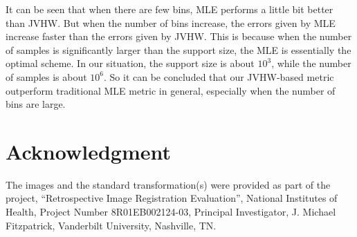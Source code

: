 \documentclass{IEEEtran}
\begin{document}
  It can be seen that when there are few bins, MLE performs a little bit better than JVHW. But when the number of bins increase, the errors given by MLE increase faster than the errors given by JVHW. This is because when the number of samples is significantly larger than the support size, the MLE is essentially the optimal scheme. In our situation, the support size is about $10^3$, while the number of samples is about $10^6$. So it can be concluded that our JVHW-based metric outperform traditional MLE metric in general, especially when the number of bins are large.

  \section{Acknowledgment}

  The images and the standard transformation(s) were provided as part of the project, ``Retrospective Image Registration Evaluation'', National Institutes of Health, Project Number 8R01EB002124-03, Principal Investigator, J. Michael Fitzpatrick, Vanderbilt University, Nashville, TN.

  
  
\end{document}
